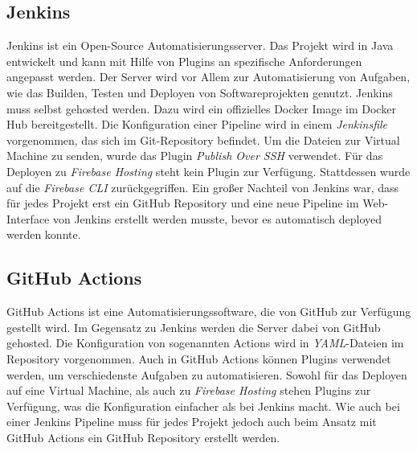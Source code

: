 \subsection{Jenkins}
Jenkins ist ein Open-Source Automatisierungsserver. Das Projekt wird in
Java entwickelt und kann mit Hilfe von Plugins an spezifische Anforderungen
angepasst werden.
Der Server wird vor Allem zur Automatisierung von Aufgaben, wie das Builden,
Testen und Deployen von Softwareprojekten genutzt.
Jenkins muss selbst gehosted werden. Dazu wird ein offizielles Docker Image
im Docker Hub bereitgestellt.
Die Konfiguration einer Pipeline wird in einem \textit{Jenkinsfile} vorgenommen,
das sich im Git-Repository befindet.
Um die Dateien zur Virtual Machine zu senden, wurde das Plugin \textit{Publish Over SSH}
verwendet. Für das Deployen zu \textit{Firebase Hosting} steht kein Plugin zur
Verfügung. Stattdessen wurde auf die \textit{Firebase CLI} zurückgegriffen.
Ein großer Nachteil von Jenkins war, dass für jedes Projekt erst ein GitHub
Repository und eine neue Pipeline im Web-Interface von Jenkins erstellt werden
musste, bevor es automatisch deployed werden konnte.


\subsection{GitHub Actions}
GitHub Actions ist eine Automatisierungssoftware, die von GitHub zur Verfügung
gestellt wird. Im Gegensatz zu Jenkins werden die Server dabei von GitHub gehosted.
Die Konfiguration von sogenannten Actions wird in \textit{YAML}-Dateien im
Repository vorgenommen.
Auch in GitHub Actions können Plugins verwendet werden, um verschiedenste Aufgaben
zu automatisieren.
Sowohl für das Deployen auf eine Virtual Machine, als auch zu \textit{Firebase Hosting}
stehen Plugins zur Verfügung, was die Konfiguration einfacher als bei Jenkins macht.
Wie auch bei einer Jenkins Pipeline muss für jedes Projekt jedoch auch beim
Ansatz mit GitHub Actions ein GitHub Repository erstellt werden.




